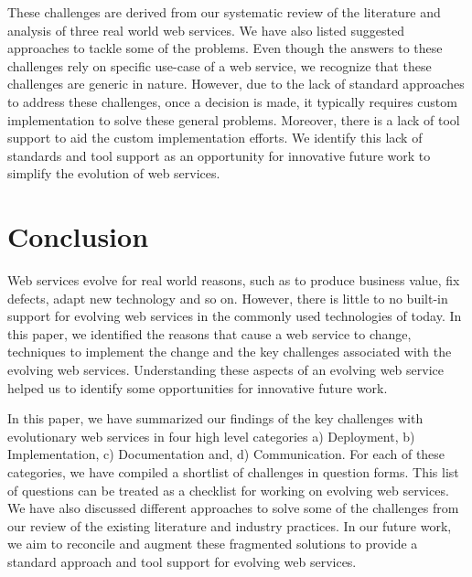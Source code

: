 \documentclass[runningheads,a4paper]{llncs}
\begin{document}
These challenges are derived from our systematic review of the literature and analysis of three real world web services. We have also listed suggested approaches to tackle some of the problems. Even though the answers to these challenges rely on specific use-case of a web service, we recognize that these challenges are generic in nature. However, due to the lack of standard approaches to address these challenges, once a decision is made, it typically requires custom implementation to solve these general problems. Moreover, there is a lack of tool support to aid the custom implementation efforts. We identify this lack of standards and tool support as an opportunity for innovative future work to simplify the evolution of web services.

\section{Conclusion} %
\label{sec:conclusion}
Web services evolve for real world reasons, such as to produce business value, fix defects, adapt new technology and so on. However, there is little to no built-in support for evolving web services in the commonly used technologies of today. In this paper, we identified the reasons that cause a web service to change, techniques to implement the change and the key challenges associated with the evolving web services. Understanding these aspects of an evolving web service helped us to identify some opportunities for innovative future work.

In this paper, we have summarized our findings of the key challenges with evolutionary web services in four high level categories a) Deployment, b) Implementation, c) Documentation and, d) Communication. For each of these categories, we have compiled a shortlist of challenges in question forms. This list of questions can be treated as a checklist for working on evolving web services. We have also discussed different approaches to solve some of the challenges from our review of the existing literature and industry practices. In our future work, we aim to reconcile and augment these fragmented solutions to provide a standard approach and tool support for evolving web services.



\end{document}
